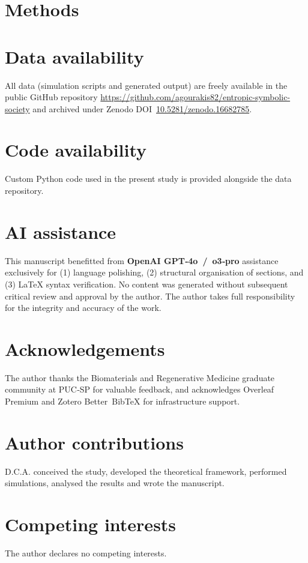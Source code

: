 \documentclass{nature}             %
\begin{document}
\section*{Methods}


\section*{Data availability}
All data (simulation scripts and generated output) are freely available in the public GitHub repository \url{https://github.com/agourakis82/entropic-symbolic-society} and archived under Zenodo DOI \href{https://doi.org/10.5281/zenodo.16682785}{10.5281/zenodo.16682785}.

\section*{Code availability}
Custom Python code used in the present study is provided alongside the data repository.

\section*{AI assistance}
This manuscript benefitted from \textbf{OpenAI GPT‑4o / o3‑pro} assistance exclusively for
(1) language polishing,
(2) structural organisation of sections, and
(3) LaTeX syntax verification.
No content was generated without subsequent critical review and approval by the author.
The author takes full responsibility for the integrity and accuracy of the work.

\section*{Acknowledgements}
The author thanks the Biomaterials and Regenerative Medicine graduate community at PUC‑SP for valuable feedback, and acknowledges Overleaf Premium and Zotero Better BibTeX for infrastructure support.

\section*{Author contributions}
D.C.A. conceived the study, developed the theoretical framework, performed simulations, analysed the results and wrote the manuscript.

\section*{Competing interests}
The author declares no competing interests.



\end{document}
